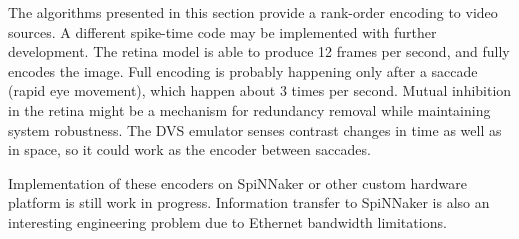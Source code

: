 The algorithms presented in this section provide a rank-order encoding to video sources. A different spike-time code may be implemented with further development. The retina model is able to produce 12 frames per second, and fully encodes the image. Full encoding is probably happening only after a saccade (rapid eye movement), which happen about 3 times per second. Mutual inhibition in the retina might be a mechanism for redundancy removal while maintaining system robustness.
The DVS emulator senses contrast changes in time as well as in space, so it could work as the encoder between saccades.

Implementation of these encoders on SpiNNaker or other custom hardware platform is still work in progress. Information transfer to SpiNNaker is also an interesting engineering problem due to Ethernet bandwidth limitations.